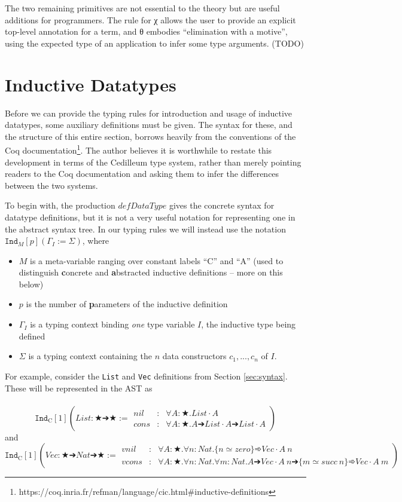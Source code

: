 \documentclass{article}
\newcommand{\indast}[4]{\texttt{Ind}_{#1} [#2] (#3 := #4)}
\begin{document}
The two remaining primitives are not essential to the theory but are useful
additions for programmers. The rule for χ allows the user to provide an
explicit top-level annotation for a term, and θ embodies ``elimination with a
motive'', using the expected type of an application to infer some type
arguments. (TODO)

\section{Inductive Datatypes}

Before we can provide the typing rules for introduction and usage of inductive
datatypes, some auxiliary definitions must be given. The syntax for these, and
the structure of this entire section, borrows heavily from the conventions of the Coq
documentation\footnote{https://coq.inria.fr/refman/language/cic.html\#inductive-definitions}.
The author believes it is worthwhile to restate this development in terms of the
Cedilleum type system, rather than merely pointing readers to the Coq
documentation and asking them to infer the differences between the two systems.

To begin with, the production $defDataType$ gives the concrete syntax for datatype definitions,
but it is not a very useful notation for representing one in the abstract syntax
tree. In our typing rules we will instead use the notation
$\indast{M}{p}{\Gamma_I}{\Sigma}$, where

\begin{itemize}
\item $M$ is a meta-variable ranging over
  constant labels ``C'' and ``A'' (used to distinguish \textbf{c}oncrete and
  \textbf{a}bstracted inductive definitions -- more on this below)
\item $p$ is the number of \textbf{p}arameters of the inductive definition
\item $\Gamma_I$ is a typing context binding \textit{one} type variable $I$, the
  inductive type being defined
\item $\Sigma$ is a typing context containing the $n$ data constructors
  $c_1,...,c_n$ of $I$.
\end{itemize}

For example, consider the \texttt{List} and \texttt{Vec} definitions from
Section \ref{sec:syntax}. These will be represented in the AST as
\\ \\
\[\indast{\text{C}}{1}{List : ★ ➔ ★}
{\begin{array}{lcl}
   nil & : & ∀ A : ★ . List \cdot A
   \\ cons & : & ∀ A : ★ . A ➔ List \cdot A ➔ List \cdot A
 \end{array}
}\] and
\\
\[\indast{\text{C}}{1}{Vec : ★ ➔ Nat ➔ ★}
{\begin{array}{lcl}
   vnil & : & ∀ A : ★ . ∀ n : Nat . \{ n ≃ zero \} ➾ Vec \cdot A\ n
   \\ vcons & : & ∀ A : ★ . ∀ n : Nat . ∀ m : Nat . A ➔ Vec \cdot A\ n ➔ \{ m ≃ succ\ n \} ➾ Vec \cdot A\ m
 \end{array}
}\]
\end{document}
